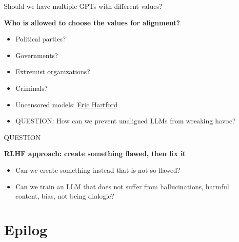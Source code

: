 \begin{vbframe}{Should we have multiple GPTs with different values?}

\vfill

\textbf{Who is allowed to choose the values for alignment?}

	\begin{itemize}
		\item Political parties?
		\item Governments?
		\item Extremist organizations?
                \item Criminals?
                \item Uncensored models:
                \href{https://erichartford.com}{Eric Hartford}
                \item QUESTION: How can we prevent unaligned
		LLMs from wreaking havoc?
	\end{itemize}

\vfill

\end{vbframe}



\begin{vbframe}{QUESTION}

\vfill

\textbf{RLHF approach: create something flawed, then fix it}

	\begin{itemize}
		\item Can we create something instead that
		is not so flawed?
                \item Can we train an LLM that does not
		suffer from hallucinations, harmful content,
		bias, not being dialogic?
	\end{itemize}

\vfill

\end{vbframe}










\section{Epilog}





